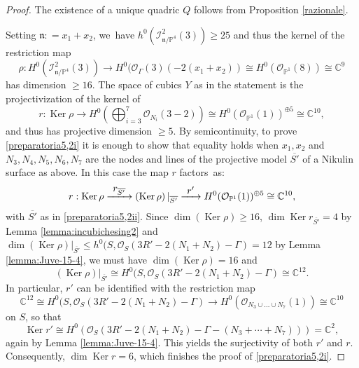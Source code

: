 \documentclass[11pt]{article}
\newcommand{\To}[1]{\mathchoice{\xrightarrow{\textstyle\kern4pt#1\kern3pt}}{\stackrel{#1}{\longrightarrow}}{}{}}
\theoremstyle{plain}
\theoremstyle{definition}
\DeclareMathOperator{\Ker}{Ker}
\newcommand\CC{{\mathbb C}}
\newcommand\PP{{\mathbb P}}
\renewcommand\O{{\mathcal O}}
\let\+\oplus
\begin{document}
\begin{proof}
The existence of a unique quadric $Q$ follows from Proposition \ref{razionale}.

Setting $\mathfrak{n}: = x_1 + x_2 $, we~have $h^0(\mathcal I^2_{\mathfrak{n}/\PP^4}(3))\geq 25$ and thus the kernel of the
restriction map
\begin{equation} \label{eq:rho4,4}
\rho: H^0(\mathcal I^2_{\mathfrak{n}/\PP^4}(3)) \to
H^0(\mathcal \O_{\Gamma}(3)(-2(x_1+x_2))\cong H^0(\O_{\PP^1}(8)) \cong \CC^9
\end{equation}
has dimension $\geq16$. The space of cubics $Y$ as in the statement is the projectivization of the kernel of
\begin{equation} \label{eq:restr2}
r: \Ker \rho \to H^0(\textstyle\bigoplus_{i=3}^7 \O_{N_i}(3-2))
\cong H^0(\O_{\PP^1}(1))^{\+ 5} \cong \CC^{10},
\end{equation}
and thus has projective dimension $\geq 5$. By semicontinuity, to prove \eqref{preparatoria5,2i} it is enough to show that equality holds when $x_1,x_2$ and $N_3,N_4,N_5,N_6,N_7$ are the nodes and lines of the projective model $\overline{S'}$ of a Nikulin surface as above. In this case the map $r$ factors~as:
\begin{equation}\label{fact} r: \Ker \rho \To{r_{\overline{S'}}}
\left(\Ker \rho\right)|_{\overline{S'}} \To{r'} H^0(\O_{\PP^1}(1))^{\+ 5} \cong \CC^{10},\end{equation}
with $\overline{S'}$ as in \eqref{preparatoria5,2ii}.
Since $\dim (\Ker \rho) \geq 16$, $\dim \Ker r_{\overline{S'}}=4$ by Lemma \ref{lemma:incubichesing2} and $\dim \left(\Ker \rho\right)|_{\overline{S'}} \leq h^0(S,\O_S(3R'-2(N_1+N_2)-\Gamma)=12$ by Lemma \ref{lemma:Juve-15-4},
we must have
$\dim (\Ker \rho) =16$ and
\[
 \left(\Ker \rho\right)|_{\overline{S'}} \cong H^0(S,\O_S(3R'-2(N_1+N_2)-\Gamma) \cong \CC^{12}.
\]
In particular, $r'$ can be identified with the restriction map
\[
 \CC^{12} \cong H^0(S,\O_S(3R'-2(N_1+N_2)-\Gamma) \to H^0(\O_{N_3 \cup \dots \cup N_7}(1)) \cong \CC^{10}
\]
on $S$, so that
\[
 \Ker r' \cong H^0(\O_S(3R'-2(N_1+N_2)-\Gamma-(N_3+\cdots+N_7)))=\CC^2,
\]
again by Lemma \ref{lemma:Juve-15-4}. This yields the surjectivity of both $r'$ and $r$. Consequently, $\dim \Ker r =6$, which finishes the proof of \eqref{preparatoria5,2i}.


\end{proof}
\end{document}

